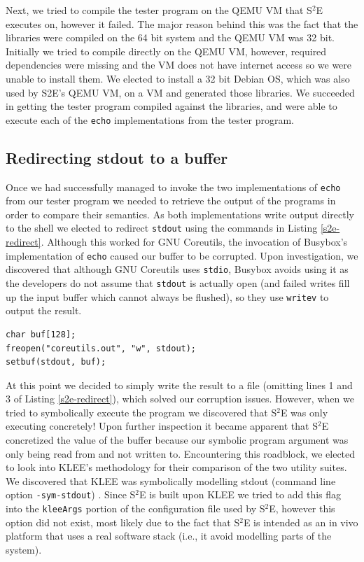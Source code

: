 \documentclass[conference]{IEEEtran}
\begin{document}
Next, we tried to compile the tester program on the QEMU VM that S$^2$E executes on, however it failed. The major reason behind this was the fact that the libraries were compiled on the 64 bit system and the QEMU VM was 32 bit. Initially we tried to compile directly on the QEMU VM, however,  required dependencies were missing and the VM does not have internet access so we were unable to install them. We elected to install a 32 bit Debian OS, which was also used by S2E's QEMU VM,  on a VM and generated those libraries. We succeeded in getting the tester program compiled against the libraries, and were able to execute each of the {\tt echo} implementations from the tester program.

\subsection{Redirecting stdout to a buffer}

Once we had successfully managed to invoke the two implementations of {\tt echo} from our tester program we needed to retrieve the output of the programs in order to compare their semantics. As both implementations write output directly to the shell we elected to redirect {\tt stdout} using the commands in Listing \ref{s2e-redirect}. Although this worked for GNU Coreutils, the invocation of Busybox's implementation of {\tt echo} caused our buffer to be corrupted. Upon investigation, we discovered that although GNU Coreutils uses {\tt stdio}, Busybox avoids using it as the developers do not assume that {\tt stdout} is actually open (and failed writes fill up the input buffer which cannot always be flushed), so they use {\tt writev} to output the result. \\ 

\begin{lstlisting}[style=C, label=s2e-redirect, abovecaptionskip=2ex, captionpos=b, caption={Code snippet for redirecting stdout to a buffer}]
char buf[128];
freopen("coreutils.out", "w", stdout);
setbuf(stdout, buf);
\end{lstlisting}

At this point we decided to simply write the result to a file (omitting lines 1 and 3 of Listing \ref{s2e-redirect}), which solved our corruption issues. However, when we tried to symbolically execute the program we discovered that S$^2$E was only executing concretely! Upon further inspection it became apparent that S$^2$E concretized the value of the buffer because our symbolic program argument was only being read from and not written to. Encountering this roadblock, we elected to look into KLEE's methodology for their comparison of the two utility suites. We discovered that KLEE was symbolically modelling stdout (command line option {\tt -sym-stdout}) \cite{klee-coreutils}. Since S$^2$E is built upon KLEE we tried to add this flag into the {\tt kleeArgs} portion of the configuration file used by S$^2$E, however this option did not exist, most likely due to the fact that S$^2$E is intended as an in vivo platform that uses a real software stack (i.e., it avoid modelling parts of the system).
\end{document}
